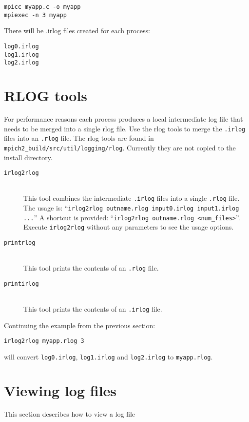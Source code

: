 \documentclass[dvipdfm,11pt]{article}
\begin{document}
\begin{verbatim}
mpicc myapp.c -o myapp
mpiexec -n 3 myapp
\end{verbatim}
There will be .irlog files created for each process:
\begin{verbatim}
log0.irlog
log1.irlog
log2.irlog
\end{verbatim}

\section{RLOG tools}
\label{sec:tools}
For performance reasons each process produces a local intermediate log file 
that needs to be merged into a single rlog file.  Use the rlog tools to merge 
the \texttt{.irlog} files into an \texttt{.rlog} file.  The rlog tools are 
found in \texttt{mpich2\_build/src/util/logging/rlog}. Currently they are not 
copied to the install directory.

\begin{description}
\item[\texttt{irlog2rlog}]\mbox{}\\
This tool combines the intermediate \texttt{.irlog} files into a single 
\texttt{.rlog} file. The usage is: ``\texttt{irlog2rlog outname.rlog 
input0.irlog input1.irlog ...}'' A shortcut is provided: ``\texttt{irlog2rlog 
outname.rlog <num\_files>}''.  Execute \texttt{irlog2rlog} without any 
parameters to see the usage options.

\item[\texttt{printrlog}]\mbox{}\\
This tool prints the contents of an \texttt{.rlog} file.

\item[\texttt{printirlog}]\mbox{}\\
This tool prints the contents of an \texttt{.irlog} file.
\end{description}

Continuing the example from the previous section:
\begin{verbatim}
irlog2rlog myapp.rlog 3
\end{verbatim}
will convert \texttt{log0.irlog}, \texttt{log1.irlog} and \texttt{log2.irlog} 
to \texttt{myapp.rlog}.

\section{Viewing log files}
This section describes how to view a log file
\end{document}
